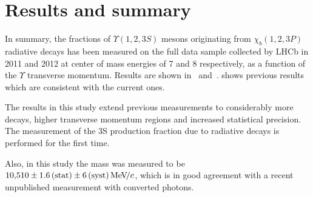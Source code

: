 \section{Results and summary}
\label{sec:results}

In summary, the fractions of $\Upsilon(1,2,3S)$ mesons originating from $\chi_b(1,2,3P)$ 
radiative decays has been measured on the full data sample collected by LHCb in 2011 and 2012 
at center of mass energies of 7 and 8 \tev respectively, as a function of the $\Upsilon$ 
transverse momentum. Results are shown in~
and~.
 shows previous \lhcb results which
are consistent with the current ones.







The results in this study extend previous \lhcb measurements to considerably
more decays, higher transverse momentum regions and increased statistical
precision. The measurement of the 
\Y3S production fraction due to radiative \chibThreeP decays is performed for the first time.

Also, in this study the \chiboneThreeP mass was measured to be $10{,}510 \pm
1.6\mathrm{\,(stat)} \pm 6\mathrm{\,(syst)} {\mathrm{\,Me\kern -0.1em V\!/}c}$, which is in good agreement with a recent
unpublished \lhcb measurement with converted photons.


